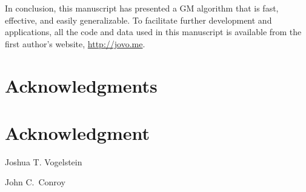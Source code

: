 \documentclass[10pt,journal,cspaper,compsoc]{IEEEtran}
\begin{document}
In conclusion, this manuscript has presented a GM algorithm that is fast, effective, and easily generalizable.  To facilitate further development and applications, all the code and data used in this manuscript is available from the first author's website, \url{http://jovo.me}.












\ifCLASSOPTIONcompsoc
  \section*{Acknowledgments}
\else
  \section*{Acknowledgment}
\fi


\ifCLASSOPTIONcaptionsoff
  \newpage
\fi




\begin{IEEEbiographynophoto}{Joshua T. Vogelstein}

\end{IEEEbiographynophoto}



\begin{IEEEbiographynophoto}{John C.~Conroy}

\end{IEEEbiographynophoto}

% 
\end{document}
